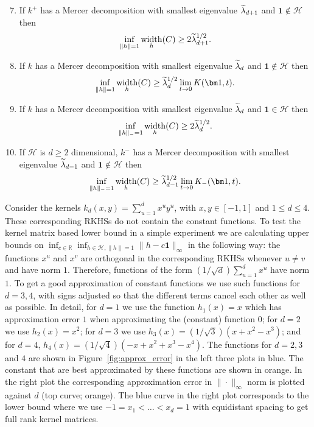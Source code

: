 \documentclass[AHL,Unicode,longabstracts,published]{cedram}
\theoremstyle{remark}
\DeclareMathOperator{\diam}{width}
\newcommand{\R}{\mathbb{R}}
\newcommand{\cH}{\mathcal{H}}
\let\oldtilde\tilde
\renewcommand*{\tilde}[1]{\mathchoice{\widetilde{#1}}{\widetilde{#1}}{\oldtilde{#1}}{\oldtilde{#1}}}
\renewcommand*{\to}{\mathchoice{\longrightarrow}{\rightarrow}{\rightarrow}{\rightarrow}}
\begin{document}
\begin{prop}
\begin{enumerate}
\setcounter{enumi}{6}
\item\label{prop2.10.7} If $k^+$ has a Mercer decomposition with smallest eigenvalue $\tilde \lambda_{d+1}$ and $\bm 1 \not \in \cH$ then
\[
\inf_{\|h\| = 1} \diam_h(C) \geq 2 \tilde \lambda_{d+1}^{1/2}.
\]
\item\label{prop2.10.8} If $k$ has a Mercer decomposition with smallest eigenvalue $\tilde \lambda_d$ and $\bm 1 \not \in \cH$ then
\[
\inf_{\|h\| = 1} \diam_h(C) \geq \tilde \lambda_d^{1/2} \lim_{t\to 0} K(\bm 1,t).
\]
\item\label{prop2.10.9} If $k$ has a Mercer decomposition with smallest eigenvalue $\tilde \lambda_{d}$ and $\bm 1 \in \cH$ then
\[
\inf_{\|h\|_- = 1} \diam_h(C) \geq 2 \tilde \lambda_{d}^{1/2}.
\]
\item\label{prop2.10.10} If $\cH$ is $d\geq 2$ dimensional, $k^-$ has a Mercer decomposition with smallest eigenvalue $\tilde \lambda_{d-1}$ and $\bm 1 \not \in \cH$ then
\[
\inf_{\|h\|_- = 1} \diam_h(C) \geq \tilde \lambda_{d-1}^{1/2} \lim_{t\to 0} K_-(\bm 1,t).
\]
\end{enumerate}
\end{prop}



\begin{exam}
Consider the kernels $k_d(x,y) = \sum_{u=1}^d x^u y^u$, with $x,y \in [-1,1]$ and $1 \leq d \leq 4$. These corresponding RKHSs do not contain the constant functions. To test the kernel matrix based lower bound in a simple experiment we are calculating upper bounds on $\inf_{c\in \R} \inf_{h \in \cH, \|h\|=1} \|h - c \bm 1\|_\infty$ in the following way: the functions $x^u$ and $x^v$ are orthogonal in the corresponding RKHSs whenever $u\not = v$ and have norm $1$. Therefore, functions of the form $(1/\sqrt{d})\sum_{u=1}^d x^u$ have norm $1$. To get a good approximation of constant functions we use such functions for $d=3,4$, with signs adjusted so that the different terms cancel each other as well as possible. In detail, for $d=1$ we use the function $h_1(x) = x$ which has approximation error $1$ when approximating the (constant) function $0$; for $d=2$ we use $h_2(x) = x^2$; for $d=3$ we use $h_3(x) = (1/\sqrt{3}) (x + x^2 - x^3)$; and for $d=4$, $h_4(x) = (1/\sqrt{4}) (-x + x^2 + x^3 - x^4)$. The functions for $d=2,3$ and $4$ are shown in Figure~\ref{fig:approx_error} in the left three plots in blue. The constant that are best approximated by these functions are shown in orange. In the right plot the corresponding approximation error in $\|\cdot\|_\infty$ norm is plotted against $d$ (top curve; orange). The blue curve in the right plot corresponds to the lower bound where we use $-1 = x_1 < \dots < x_d =1$ with equidistant spacing to get full rank kernel matrices.
\end{exam}
\end{document}
